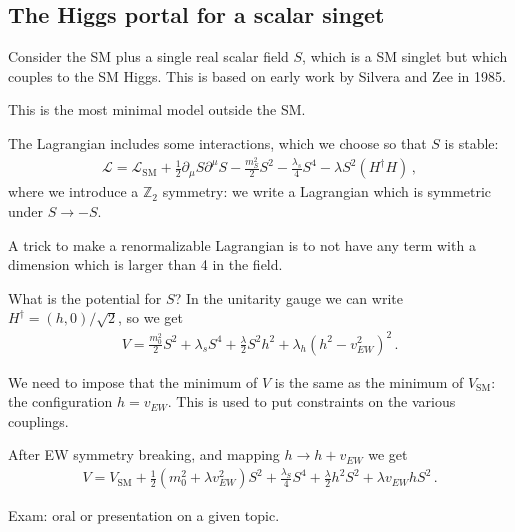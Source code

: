 \documentclass[main.tex]{subfiles}
\begin{document}
\subsection{The Higgs portal for a scalar singet}

Consider the SM plus a single real scalar field \(S\), 
which is a SM singlet but which couples to the SM Higgs. 
This is based on early work by Silvera and Zee in 1985. 

This is the most minimal model outside the SM.

The Lagrangian includes some interactions, which we choose so that \(S\) is stable: 
%
\begin{align}
\mathscr{L} = \mathscr{L} _{\text{SM}} + \frac{1}{2} \partial_\mu S \partial^\mu S 
- \frac{m_S^2}{2} S^2
- \frac{\lambda_s}{4} S^4
- \lambda S^2 (H ^\dag H)
\,,
\end{align}
%
where we introduce a \(\mathbb{Z}_2\) symmetry: 
we write a Lagrangian which is symmetric under \(S \to - S\). 

A trick to make a renormalizable Lagrangian is to not have any term with a 
dimension which is larger than 4 in the field. 

What is the potential for \(S\)? 
In the unitarity gauge we can write \(H ^\dag  = (h, 0 ) / \sqrt{2}\), 
so we get 
%
\begin{align}
V = \frac{m_0^2}{2} S^2 + \lambda _s S^4 + \frac{\lambda}{2} S^2 h^2
+ \lambda _h (h^2 - v_{EW}^2)^2
\,.
\end{align}

We need to impose that the minimum of \(V\) is the same as the minimum of \(V _{\text{SM}}\): 
the configuration \(h = v _{EW}\).
This is used to put constraints on the various couplings. 

After EW symmetry breaking, and mapping \(h \to h + v_{EW}\) we get 
%
\begin{align}
V = V _{\text{SM}} + \frac{1}{2} (m_{0}^2 + \lambda v_{EW}^2) S^2
+ \frac{\lambda_S}{4} S^4 
+ \frac{\lambda}{2} h^2 S^2
+ \lambda v_{EW} h S^2
\,.
\end{align}

Exam: oral or presentation on a given topic.
\end{document}
